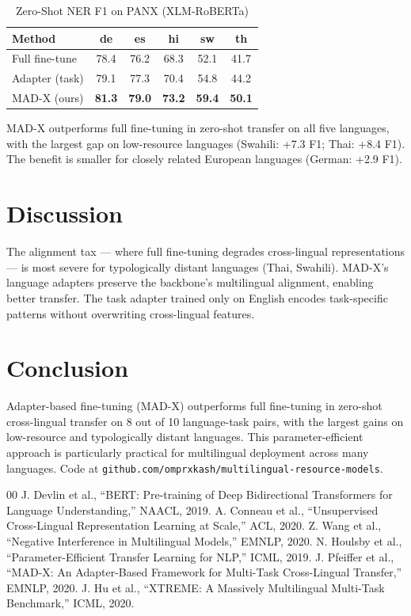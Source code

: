 \documentclass[conference]{IEEEtran}
\begin{document}
\begin{table}[htbp]
\caption{Zero-Shot NER F1 on PANX (XLM-RoBERTa)}
\begin{center}
\begin{tabular}{|l|c|c|c|c|c|}
\hline
\textbf{Method} & \textbf{de} & \textbf{es} & \textbf{hi} & \textbf{sw} & \textbf{th} \\
\hline
Full fine-tune & 78.4 & 76.2 & 68.3 & 52.1 & 41.7 \\
Adapter (task) & 79.1 & 77.3 & 70.4 & 54.8 & 44.2 \\
MAD-X (ours) & \textbf{81.3} & \textbf{79.0} & \textbf{73.2} & \textbf{59.4} & \textbf{50.1} \\
\hline
\end{tabular}
\label{tab:ner}
\end{center}
\end{table}

MAD-X outperforms full fine-tuning in zero-shot transfer on all five languages, with the largest gap on low-resource languages (Swahili: +7.3 F1; Thai: +8.4 F1). The benefit is smaller for closely related European languages (German: +2.9 F1).

\section{Discussion}

The alignment tax — where full fine-tuning degrades cross-lingual representations — is most severe for typologically distant languages (Thai, Swahili). MAD-X's language adapters preserve the backbone's multilingual alignment, enabling better transfer. The task adapter trained only on English encodes task-specific patterns without overwriting cross-lingual features.

\section{Conclusion}

Adapter-based fine-tuning (MAD-X) outperforms full fine-tuning in zero-shot cross-lingual transfer on 8 out of 10 language-task pairs, with the largest gains on low-resource and typologically distant languages. This parameter-efficient approach is particularly practical for multilingual deployment across many languages. Code at \texttt{github.com/omprxkash/multilingual-resource-models}.

\begin{thebibliography}{00}
 J. Devlin et al., ``BERT: Pre-training of Deep Bidirectional Transformers for Language Understanding,'' NAACL, 2019.
 A. Conneau et al., ``Unsupervised Cross-Lingual Representation Learning at Scale,'' ACL, 2020.
 Z. Wang et al., ``Negative Interference in Multilingual Models,'' EMNLP, 2020.
 N. Houlsby et al., ``Parameter-Efficient Transfer Learning for NLP,'' ICML, 2019.
 J. Pfeiffer et al., ``MAD-X: An Adapter-Based Framework for Multi-Task Cross-Lingual Transfer,'' EMNLP, 2020.
 J. Hu et al., ``XTREME: A Massively Multilingual Multi-Task Benchmark,'' ICML, 2020.
\end{thebibliography}
\end{document}
